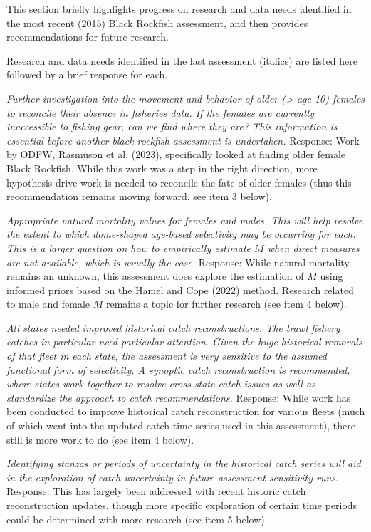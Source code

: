 \documentclass[11pt,
  english,
  letterpaper,
]{article}
\begin{document}
This section briefly highlights progress on research and data needs identified in the most recent (2015) Black Rockfish assessment, and then provides recommendations for future research.

Research and data needs identified in the last assessment (italics) are listed here followed by a brief response for each.

\textit{Further investigation into the movement and behavior of older (> age 10) females to reconcile their absence in fisheries data. If the females are currently inaccessible to fishing gear, can we find where they are? This information is essential before another black rockfish assessment is undertaken.} Response: Work by ODFW, Rasmuson et al. (2023), specifically looked at finding older female Black Rockfish. While this work was a step in the right direction, more hypothesis-drive work is needed to reconcile the fate of older females (thus this recommendation remains moving forward, see item 3 below).

\textit{Appropriate natural mortality values for females and males. This will help resolve the extent to which dome-shaped age-based selectivity may be occurring for each. This is a larger question on how to empirically estimate $M$ when direct measures are not available, which is usually the case.} Response: While natural mortality remains an unknown, this assessment does explore the estimation of \(M\) using informed priors based on the Hamel and Cope (2022) method. Research related to male and female \(M\) remains a topic for further research (see item 4 below).

\textit{All states needed improved historical catch reconstructions. The trawl fishery catches in particular need particular attention. Given the huge historical removals of that fleet in each state, the assessment is very sensitive to the assumed functional form of selectivity. A synoptic catch reconstruction is recommended, where states work together to resolve cross-state catch issues as well as standardize the approach to catch recommendations.} Response: While work has been conducted to improve historical catch reconstruction for various fleets (much of which went into the updated catch time-series used in this assessment), there still is more work to do (see item 4 below).

\textit{Identifying stanzas or periods of uncertainty in the historical catch series will aid in the exploration of catch uncertainty in future assessment sensitivity runs.} Response: This has largely been addressed with recent historic catch reconstruction updates, though more specific exploration of certain time periods could be determined with more research (see item 5 below).
\end{document}
